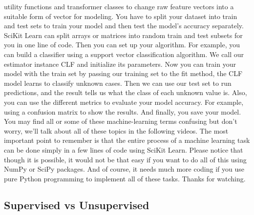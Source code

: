 utility functions and transformer classes to change raw feature vectors into a suitable form of vector for modeling. You have to split your dataset into train and test sets to train your model and then test the model's accuracy separately. SciKit Learn can split arrays or matrices into random train and test subsets for you in one line of code. Then you can set up your algorithm. For example, you can build a classifier using a support vector classification algorithm. We call our estimator instance CLF and initialize its parameters. Now you can train your model with the train set by passing our training set to the fit method, the CLF model learns to classify unknown cases. Then we can use our test set to run predictions, and the result tells us what the class of each unknown value is. Also, you can use the different metrics to evaluate your model accuracy. For example, using a confusion matrix to show the results. And finally, you save your model. You may find all or some of these machine-learning terms confusing but don't worry, we'll talk about all of these topics in the following videos. The most important point to remember is that the entire process of a machine learning task can be done simply in a few lines of code using SciKit Learn. Please notice that though it is possible, it would not be that easy if you want to do all of this using NumPy or SciPy packages. And of course, it needs much more coding if you use pure Python programming to implement all of these tasks. Thanks for watching. 
		
	\subsection{Supervised vs Unsupervised}
		
